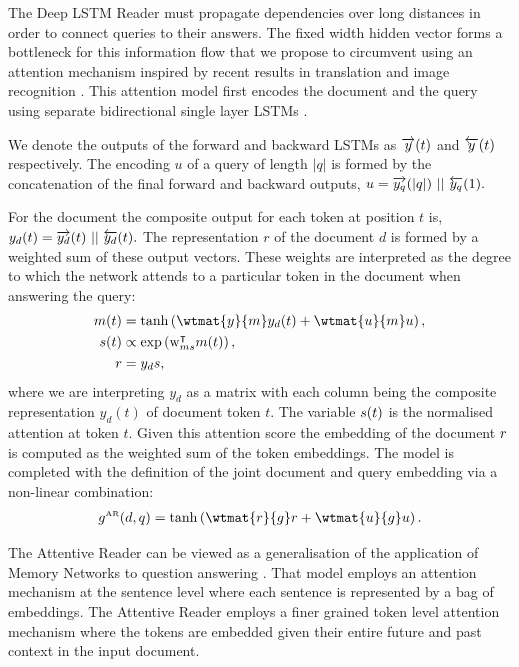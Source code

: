 The Deep LSTM Reader must propagate dependencies over long distances in order to
connect queries to their answers. The fixed width hidden vector forms a
bottleneck for this information flow that we propose to circumvent using an
attention mechanism inspired by recent results in translation and image
recognition \cite{Bahdanau:2014:NMT,Mnih:2014:RMVA}.
This attention model first encodes the document and the query using separate
bidirectional single layer LSTMs \cite{Graves:2012:SSLRNN}.

We denote the
outputs of the forward and backward LSTMs as $\overrightarrow{y}(t)$ and $\overleftarrow{y}(t)$
respectively.  The encoding $u$ of a query of length $|q|$ is formed by the
concatenation of the final forward and backward outputs,
$u = \overrightarrow{y_q}(|q|)\,\, ||\,\, \overleftarrow{y_q}(1).$

For the document the composite output for each token at position $t$ is,
$y_d(t) = \overrightarrow{y_d}(t)\,\, ||\,\, \overleftarrow{y_d}(t).$
The representation $r$ of the document $d$ is formed by a weighted sum of these
output vectors. These weights are interpreted as the degree to which the network
attends to a particular token in the document when answering the query:
\begin{align*}
  \attnIn(t)    &= \tanh\left(\wtmat{\attnOver}{\attnIn} \attnOver_d(t)
                   + \wtmat{\attnU}{\attnIn} \attnU\right),\\
  \attnScore(t) &\propto \exp \left(\mathrm{w}_{\attnIn\attnScore}^\intercal
                         \attnIn(t) \right),\\
  \attnMix   &= \attnOver_d \attnScore,
\end{align*}
where we are interpreting $y_d$ as a matrix with each column being the composite
representation $y_d(t)$ of document token $t$.
The variable $s(t)$ is the normalised attention at token $t$. Given
this attention score the embedding of the document $r$ is computed as the
weighted sum of the token embeddings.
The model is completed with the definition of the joint document and query
embedding via a non-linear combination:
\begin{align*}
  g^{\text{\tiny AR}}(d,q) = \tanh \left(\wtmat{\attnMix}{g} \attnMix
                             + \wtmat{\attnU}{g} \attnU \right).
\end{align*}

The Attentive Reader can be viewed as a generalisation of the application of
Memory Networks to question answering \cite{Weston:2014:MN}. That model employs
an attention mechanism at the sentence level where each sentence is represented
by a bag of embeddings. The Attentive Reader employs a finer grained token
level attention mechanism where the tokens are embedded given their entire
future and past context in the input document.

